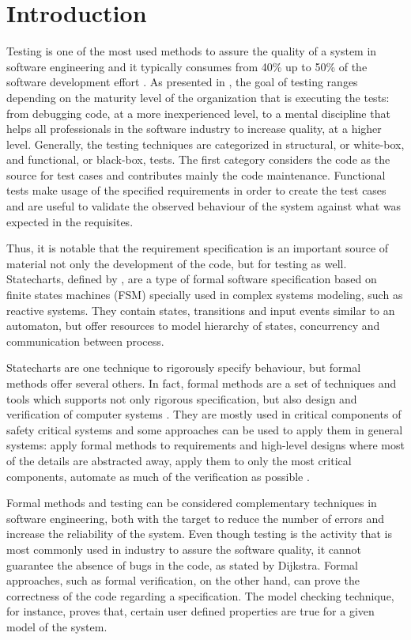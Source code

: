 \chapter{Introduction}
\label{cap:introducao}

Testing is one of the most used methods to assure the quality of a system in software engineering and it typically consumes from 40\% up to 50\% of the software development effort \cite{Luo}. As presented in \cite{Ammann:08}, the goal of testing ranges depending on the maturity level of the organization that is executing the tests: from debugging code, at a more inexperienced level, to a mental discipline that helps all professionals in the software industry to increase quality, at a higher level. Generally, the testing techniques are categorized in structural, or white-box, and functional, or black-box, tests. The first category considers the code as the source for test cases and contributes mainly the code maintenance. Functional tests make usage of the specified requirements in order to create the test cases and are useful to validate the observed behaviour of the system against what was expected in the requisites.

Thus, it is notable that the requirement specification is an important source of material not only the development of the code, but for testing as well. Statecharts, defined by \cite{harel87:semantics_statecharts}, are a type of formal software specification based on finite states machines (FSM) specially used in complex systems modeling, such as reactive systems. They contain states, transitions and input events similar to an automaton, but offer resources to model hierarchy of states, concurrency and communication between process.

Statecharts are one technique to rigorously specify behaviour, but formal methods offer several others. In fact, formal methods are a set of techniques and tools which supports not only rigorous specification, but also design and verification of computer systems \cite{FMEurope}. They are mostly used in critical components of safety critical systems and some approaches can be used to apply them in general systems: apply formal methods to requirements and high-level designs where most of the details are abstracted away, apply them to only the most critical components, automate as much of the verification as possible \cite{NASAlangley}. 


Formal methods and testing can be considered complementary techniques in software engineering, both with the target to reduce the number of errors and increase the reliability of the system\cite{fortest}. Even though testing is the activity that is most commonly used in industry to assure the software quality, it cannot guarantee the absence of bugs in the code, as stated by Dijkstra. Formal approaches, such as formal verification, on the other hand, can prove the correctness of the code regarding a specification. The model checking technique, for instance, proves that, certain user defined properties are true for a given model of the system.


